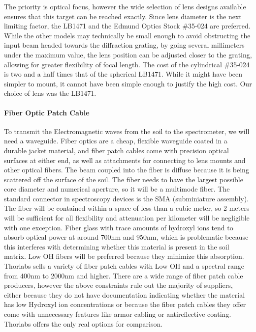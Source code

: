 The priority is optical focus, however the wide selection of lens designs available ensures that this target can be reached exactly. Since lens diameter is the next limiting factor, the LB1471 and the Edmund Optics Stock \#35-024 are preferred. While the other models may technically be small enough to avoid obstructing the input beam headed towards the diffraction grating, by going several millimeters under the maximum value, the lens position can be adjusted closer to the grating, allowing for greater flexibility of focal length. The cost of the cylindrical \#35-024 is two and a half times that of the spherical LB1471. While it might have been simpler to mount, it cannot have been simple enough to justify the high cost. Our choice of lens was the LB1471. 

\paragraph{Fiber Optic Patch Cable}

To transmit the Electromagnetic waves from the soil to the spectrometer, we will need a waveguide. Fiber optics are a cheap, flexible waveguide coated in a durable jacket material, and fiber patch cables come with precision optical surfaces at either end, as well as attachments for connecting to lens mounts and other optical fibers. The beam coupled into the fiber is diffuse because it is being scattered off the surface of the soil. The fiber needs to have the largest possible core diameter and numerical aperture, so it will be a multimode fiber. The standard connector in spectroscopy devices is the SMA (subminiature assembly). The fiber will be contained within a space of less than a cubic meter, so 2 meters will be sufficient for all flexibility and attenuation per kilometer will be negligible with one exception. Fiber glass with trace amounts of hydroxyl ions tend to absorb optical power at around 700nm and 950nm, which is problematic because this interferes with determining whether this material is present in the soil matrix. Low OH fibers will be preferred because they minimize this absorption. Thorlabs sells a variety of fiber patch cables with Low OH and a spectral range from 400nm to 2000nm and higher.
There are a wide range of fiber patch cable producers, however the above constraints rule out the majority of suppliers, either because they do not have documentation indicating whether the material has low Hydroxyl ion concentrations or because the fiber patch cables they offer come with unnecessary features like armor cabling or antireflective coating. Thorlabs offers the only real options for comparison.

